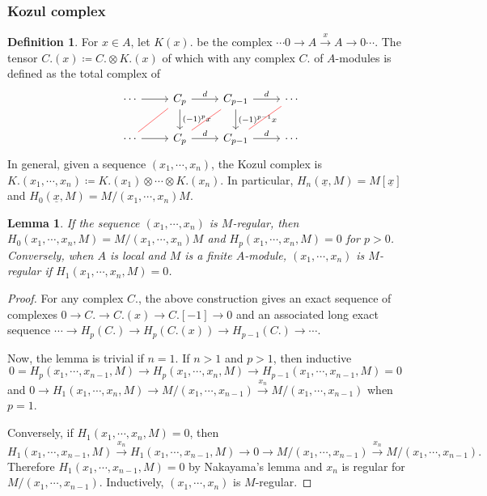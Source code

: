 \documentclass[leqno]{amsart}
\newcommand{\1}{\mathbf{1}}
\newtheorem{lem}[thm]{Lemma}
\theoremstyle{definition}
\newtheorem{defn}[thm]{Definition}
\theoremstyle{remark}
\begin{document}
\subsubsection{Kozul complex}

\begin{defn}
	For $x\in A$, let $K(x).$ be the complex 
	$\cdots0\to A\xrightarrow{x}A\to 0\cdots$.
	The tensor $C.(x)\coloneqq C.\otimes K.(x)$ 
	of which with any complex  $C.$ of $A$-modules
	is defined as the total complex of
	\[
		\begin{tikzcd}
			\cdots\arrow[r]&
			C_p\arrow[r,"d"]\arrow[d,"(-1)^{p}x"]
			\arrow[dl,dash,red]&
			C_{p-1}\arrow[r,"d"]
			\arrow[d,"(-1)^{p-1}x"]
			\arrow[dl,dash,red]&\cdots
			\arrow[dl,dash,red]\\
			\cdots\arrow[r]&
			C_p\arrow[r,"d"]&
			C_{p-1}\arrow[r,"d"]&\cdots
		\end{tikzcd}
	\]
	In general, given a sequence $(x_1,\cdots,x_n)$,
	the Kozul complex is 
	$K.(x_1,\cdots,x_n)\coloneqq 
	K.(x_1)\otimes\cdots\otimes K.(x_n)$.
	In particular,
	$H_n(\underline{x},M)=M[\underline{x}]$
	and
	$H_0(\underline{x},M)=M/(x_1,\cdots,x_n)M$.
\end{defn}
\begin{lem}
	If the sequence $(x_1,\cdots,x_n)$ is $M$-regular,
	then 
	$H_0(x_1,\cdots,x_n,M)=M/(x_1,\cdots,x_n)M$
	and
	$H_p(x_1,\cdots,x_n,M)=0$ for $p>0$.
	Conversely, 
	when $A$ is local and  $M$ is a finite  $A$-module,
	$(x_1,\cdots,x_n)$ is $M$-regular if 
	$H_1(x_1,\cdots,x_n,M)=0$.
\end{lem}
\begin{proof}
	For any complex $C.$, the above construction 
	gives an exact sequence of complexes
	$0\to C.\to C.(x)\to C.[-1]\to 0$
	and an associated long exact sequence
	$\cdots\to H_p(C.)\to H_p(C.(x))\to H_{p-1}(C.)\to \cdots$.
		
	Now, the lemma is trivial if $n=1$.
	If $n>1$ and $p>1$, then inductive
	\[
		0=H_{p}(x_1,\cdots,x_{n-1},M)\to
		H_{p}(x_1,\cdots,x_n,M)\to
		H_{p-1}(x_1,\cdots,x_{n-1},M)=0\quad
	\]
	and $0\to H_{1}(x_1,\cdots,x_{n},M)\to
	M/(x_1,\cdots,x_{n-1})\xrightarrow{x_{n}}
	M/(x_1,\cdots,x_{n-1})$
	when $p=1$.
	
	Conversely, if $H_{1}(x_1,\cdots,x_{n},M)=0$,
	then
	\[
		H_{1}(x_1,\cdots,x_{n-1},M)
		\xrightarrow{x_{n}}
		H_{1}(x_1,\cdots,x_{n-1},M)\to 0\to
		M/(x_1,\cdots,x_{n-1})
		\xrightarrow{x_{n}}
		M/(x_1,\cdots,x_{n-1}).
	\]
	Therefore $H_{1}(x_1,\cdots,x_{n-1},M)=0$
	by Nakayama's lemma 
	and $x_n$ is regular for  $M/(x_1,\cdots,x_{n-1})$.
	Inductively, $(x_1,\cdots,x_n)$ is $M$-regular.
\end{proof}
\end{document}
